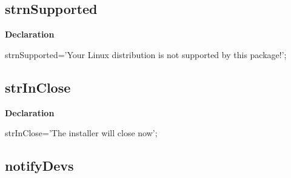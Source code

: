 \documentclass{report}
\newif\ifpdf
\begin{document}
\subsection*{strnSupported}
\fi
\label{trstrings-strnSupported}
\begin{list}{}{
\setlength{\itemindent}{0cm}
\setlength{\listparindent}{0cm}
\setlength{\leftmargin}{\evensidemargin}
\addtolength{\leftmargin}{\tmplength}
\settowidth{\labelsep}{X}
\addtolength{\leftmargin}{\labelsep}
\setlength{\labelwidth}{\tmplength}
}
\item[\textbf{Declaration}\hfill]
\ifpdf
\begin{flushleft}
\fi
\begin{ttfamily}
strnSupported='Your Linux distribution is not supported by this package!';\end{ttfamily}

\ifpdf
\end{flushleft}
\fi

\end{list}
\ifpdf
\subsection*{\large{\textbf{strInClose}}\normalsize\hspace{1ex}\hrulefill}
\else
\subsection*{strInClose}
\fi
\label{trstrings-strInClose}
\begin{list}{}{
\setlength{\itemindent}{0cm}
\setlength{\listparindent}{0cm}
\setlength{\leftmargin}{\evensidemargin}
\addtolength{\leftmargin}{\tmplength}
\settowidth{\labelsep}{X}
\addtolength{\leftmargin}{\labelsep}
\setlength{\labelwidth}{\tmplength}
}
\item[\textbf{Declaration}\hfill]
\ifpdf
\begin{flushleft}
\fi
\begin{ttfamily}
strInClose='The installer will close now';\end{ttfamily}

\ifpdf
\end{flushleft}
\fi

\end{list}
\ifpdf
\subsection*{\large{\textbf{notifyDevs}}\normalsize\hspace{1ex}\hrulefill}
\else
\end{document}

